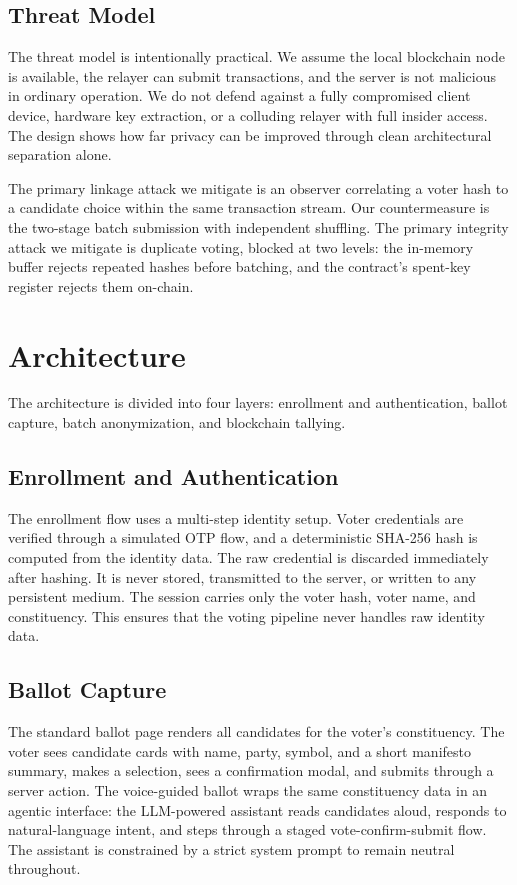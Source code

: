 \documentclass{ieeeaccess}
\begin{document}
\subsection{Threat Model}
The threat model is intentionally practical. We assume the local blockchain node is available, the relayer can submit transactions, and the server is not malicious in ordinary operation. We do not defend against a fully compromised client device, hardware key extraction, or a colluding relayer with full insider access. The design shows how far privacy can be improved through clean architectural separation alone.

The primary linkage attack we mitigate is an observer correlating a voter hash to a candidate choice within the same transaction stream. Our countermeasure is the two-stage batch submission with independent shuffling. The primary integrity attack we mitigate is duplicate voting, blocked at two levels: the in-memory buffer rejects repeated hashes before batching, and the contract's spent-key register rejects them on-chain.

\section{Architecture}
The architecture is divided into four layers: enrollment and authentication, ballot capture, batch anonymization, and blockchain tallying.

\subsection{Enrollment and Authentication}
The enrollment flow uses a multi-step identity setup. Voter credentials are verified through a simulated OTP flow, and a deterministic SHA-256 hash is computed from the identity data. The raw credential is discarded immediately after hashing. It is never stored, transmitted to the server, or written to any persistent medium. The session carries only the voter hash, voter name, and constituency. This ensures that the voting pipeline never handles raw identity data.

\subsection{Ballot Capture}
The standard ballot page renders all candidates for the voter's constituency. The voter sees candidate cards with name, party, symbol, and a short manifesto summary, makes a selection, sees a confirmation modal, and submits through a server action. The voice-guided ballot wraps the same constituency data in an agentic interface: the LLM-powered assistant reads candidates aloud, responds to natural-language intent, and steps through a staged vote-confirm-submit flow. The assistant is constrained by a strict system prompt to remain neutral throughout.
\end{document}
